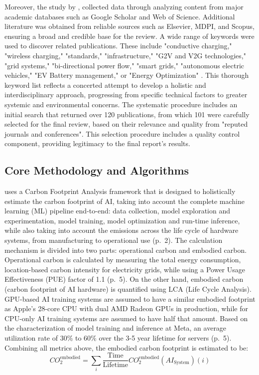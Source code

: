 \documentclass[a4paper, 12pt]{article}
\begin{document}
\par Moreover, the study by \citet{M.rauf2024}, collected data through analyzing content from major academic databases such as Google Scholar and Web of Science. Additional literature was obtained from reliable sources such as Elsevier, MDPI, and Scopus, ensuring a broad and credible base for the review. A wide range of keywords were used to discover related publications. These include "conductive charging," "wireless charging," "standards," "infrastructure," "G2V and V2G technologies," "grid systems," "bi-directional power flow," "smart grids," "autonomous electric vehicles," "EV Battery management," or "Energy Optimization" .  This thorough keyword list reflects a concerted attempt to develop a holistic and interdisciplinary approach, progressing from specific technical factors to greater systemic and environmental concerns.  The systematic procedure includes an initial search that returned over 120 publications, from which 101 were carefully selected for the final review, based on their relevance and quality from "reputed journals and conferences".  This selection procedure includes a quality control component, providing legitimacy to the final report's results.

\subsection{Core Methodology and Algorithms} 
\citet{Wu2022} uses a Carbon Footprint Analysis framework that is designed to holistically estimate the carbon footprint of AI, taking into account the complete machine learning (ML) pipeline end-to-end: data collection, model exploration and experimentation, model training, model optimization and run-time inference, while also taking into account the emissions across the life cycle of hardware systems, from manufacturing to operational use (p.~2). The calculation mechanism is divided into two parts: operational carbon and embodied carbon. Operational carbon is calculated by measuring the total energy consumption, location-based carbon intensity for electricity grids, while using a Power Usage Effectiveness (PUE) factor of 1.1 (p.~5). On the other hand, embodied carbon (carbon footprint of AI hardware) is quantified using LCA (Life Cycle Analysis). GPU-based AI training systems are assumed to have a similar embodied footprint as Apple's 28-core CPU with dual AMD Radeon GPUs in production, while for CPU-only AI training systems are assumed to have half that amount.  Based on the characterization of model training and inference at Meta, an average utilization rate of 30\% to 60\% over the 3-5 year lifetime for servers (p.~5). Combining all metrics above, the embodied carbon footprint is estimated to be: 
\begin{equation}
	CO_2^{\text{embodied}} = \sum_i \frac{\text{Time}}{\text{Lifetime}} CO_2^{\text{embodied}}(AI_{\text{System}})(i)
\end{equation}
\end{document}
